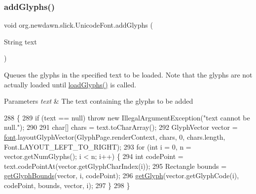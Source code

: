 \subsubsection{\texorpdfstring{add\+Glyphs()}{addGlyphs()}\hspace{0.1cm}{\footnotesize\ttfamily [2/2]}}
{\footnotesize\ttfamily void org.\+newdawn.\+slick.\+Unicode\+Font.\+add\+Glyphs (\begin{DoxyParamCaption}\item[{String}]{text }\end{DoxyParamCaption})\hspace{0.3cm}{\ttfamily [inline]}}

Queues the glyphs in the specified text to be loaded. Note that the glyphs are not actually loaded until \mbox{\hyperlink{classorg_1_1newdawn_1_1slick_1_1_unicode_font_abf14d8ad33f80b66e14990417bd04088}{load\+Glyphs()}} is called.


\begin{DoxyParams}{Parameters}
{\em text} & The text containing the glyphs to be added \\
\hline
\end{DoxyParams}

\begin{DoxyCode}
288                                        \{
289         \textcolor{keywordflow}{if} (text == null) \textcolor{keywordflow}{throw} \textcolor{keyword}{new} IllegalArgumentException(\textcolor{stringliteral}{"text cannot be null."});
290 
291         \textcolor{keywordtype}{char}[] chars = text.toCharArray();
292         GlyphVector vector = \mbox{\hyperlink{classorg_1_1newdawn_1_1slick_1_1_unicode_font_a956ab491839be375d47444a67ebff11c}{font}}.layoutGlyphVector(GlyphPage.renderContext, chars, 0, chars.length, 
      Font.LAYOUT\_LEFT\_TO\_RIGHT);
293         \textcolor{keywordflow}{for} (\textcolor{keywordtype}{int} i = 0, n = vector.getNumGlyphs(); i < n; i++) \{
294             \textcolor{keywordtype}{int} codePoint = text.codePointAt(vector.getGlyphCharIndex(i));
295             Rectangle bounds = \mbox{\hyperlink{classorg_1_1newdawn_1_1slick_1_1_unicode_font_a61a42b9754ad2307b80a8699d484a158}{getGlyphBounds}}(vector, i, codePoint);
296             \mbox{\hyperlink{classorg_1_1newdawn_1_1slick_1_1_unicode_font_a30b90c7e39d5561f93cae92300ed5a22}{getGlyph}}(vector.getGlyphCode(i), codePoint, bounds, vector, i);
297         \}
298     \}
\end{DoxyCode}
\mbox{\label{classorg_1_1newdawn_1_1slick_1_1_unicode_font_a1c521d217c4c28d60a085fa65f57f459}} 
